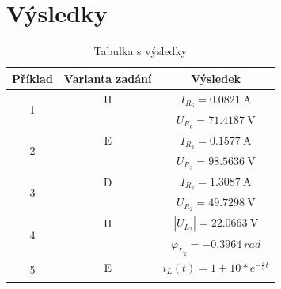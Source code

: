 \documentclass[a4paper]{article}
\begin{document}
\section{Výsledky}
\begin{table}[htbp]
  \begin{center}
    \begin{tabular}{|c|c|c|} 
      \hline
       Příklad & Varianta zadání & Výsledek\\
       \hline
       
       \multirow[t]{2}{*}{1} & H & $I_{R_6} = \SI{0,0821}{\ampere}$\\
        & & $U_{R_6} = \SI{71,4187}{\volt}$\\ 
        
       \hline
       \multirow[t]{2}{*}{2} & E & $I_{R_3} = \SI{0,1577}{\ampere}$\\
        & & $U_{R_3} = \SI{98,5636}{\volt}$ \\ 
       \hline
       \multirow[t]{2}{*}{3} & D & $I_{R_2} = \SI{1,3087}{\ampere}$\\
        & & $U_{R_2} = \SI{49,729 8}{\volt}$ \\ 
       \hline
       \multirow[t]{2}{*}{4} & H & $|U_{L_2}| = \SI{22,0663}{\volt}$\\
        & & $\varphi_{L_2} = \SI{-0,3964}{rad}$ \\ 
       \hline
       \multirow[t]{2}{*}{5} & E & $i_L(t) = 1 + 10 * e^{-\frac{4}{3}t}$\\
        & & \\ 
     \hline
    \end{tabular}
    \caption{Tabulka s výsledky}
    \label{tab:6}
  \end{center}
 \end{table}
\end{document}
